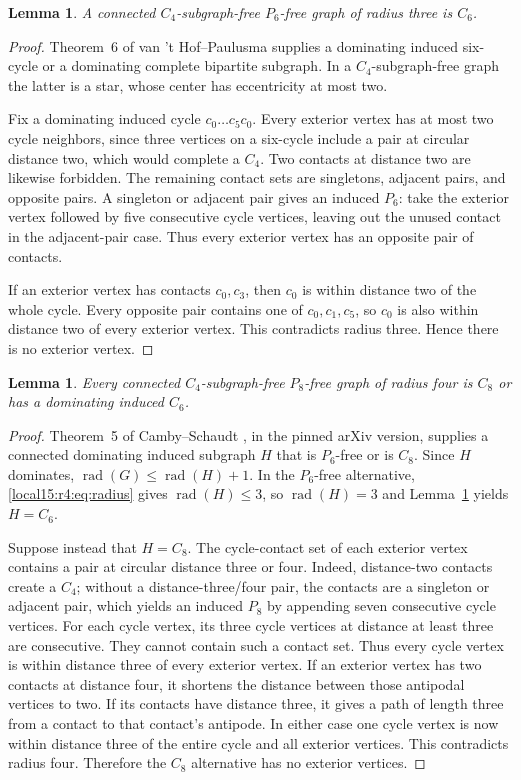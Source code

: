 \documentclass[11pt,a4paper]{article}
\newtheorem{lemma}[theorem]{Lemma}
\theoremstyle{definition}\newtheorem{definition}[theorem]{Definition}
\theoremstyle{remark}\newtheorem{remark}[theorem]{Remark}
\begin{document}
\begin{lemma}\label{local15:r4:lem:p6}
A connected $C_4$-subgraph-free $P_6$-free graph of radius three is $C_6$.
\end{lemma}
\begin{proof}
Theorem~6 of van 't Hof--Paulusma \cite{src:hof} supplies a dominating induced
six-cycle or a dominating complete bipartite subgraph. In a
$C_4$-subgraph-free graph the latter is a star, whose center has
 eccentricity at most two.

Fix a dominating induced cycle $c_0\dots c_5c_0$. Every exterior vertex
has at most two cycle neighbors, since three vertices on a six-cycle
include a pair at circular distance two, which would complete a $C_4$.
Two contacts at distance two are likewise forbidden. The remaining
contact sets are singletons, adjacent pairs, and opposite pairs.
A singleton or adjacent pair gives an induced $P_6$: take the exterior
vertex followed by five consecutive cycle vertices, leaving out the
unused contact in the adjacent-pair case. Thus every exterior vertex has
an opposite pair of contacts.

If an exterior vertex has contacts $c_0,c_3$, then $c_0$ is within distance
two of the whole cycle. Every opposite pair contains one of
$c_0,c_1,c_5$, so $c_0$ is also within distance two of every exterior
vertex. This contradicts radius three. Hence there is no exterior vertex.
\end{proof}

\begin{lemma}\label{local15:r4:lem:cycle}
Every connected $C_4$-subgraph-free $P_8$-free graph of radius four is
$C_8$ or has a dominating induced $C_6$.
\end{lemma}
\begin{proof}
Theorem~5 of Camby--Schaudt \cite{src:camby}, in the pinned arXiv version,
supplies a connected dominating induced subgraph $H$ that is $P_6$-free
or is $C_8$. Since $H$ dominates,
$\operatorname{rad}(G)\le\operatorname{rad}(H)+1$. In the $P_6$-free alternative,
\eqref{local15:r4:eq:radius} gives $\operatorname{rad}(H)\le3$, so $\operatorname{rad}(H)=3$ and
Lemma~\ref{local15:r4:lem:p6} yields $H=C_6$.

Suppose instead that $H=C_8$. The cycle-contact set of each exterior
vertex contains a pair at circular distance three or four. Indeed,
distance-two contacts create a $C_4$; without a distance-three/four pair,
the contacts are a singleton or adjacent pair, which yields an induced
$P_8$ by appending seven consecutive cycle vertices.
For each cycle vertex, its three cycle vertices at distance at least
three are consecutive. They cannot contain such a contact set. Thus
every cycle vertex is within distance three of every exterior vertex.
If an exterior vertex has two contacts at distance four, it shortens the
distance between those antipodal vertices to two. If its contacts have
distance three, it gives a path of length three from a contact to that
contact's antipode. In either case one cycle vertex is now within
distance three of the entire cycle and all exterior vertices. This
contradicts radius four. Therefore the $C_8$ alternative has no exterior
vertices.
\end{proof}
\end{document}
